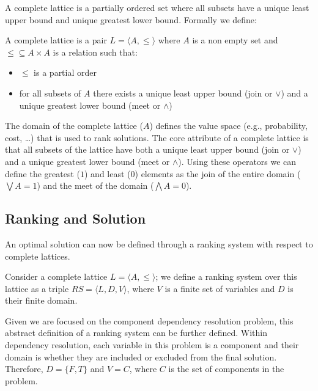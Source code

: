 A complete lattice is a partially ordered set where all subsets have a unique least upper bound and unique greatest lower bound.
Formally we define:
\begin{defs}
A complete lattice is a pair $L = \langle A, \leq \rangle$ where $A$ is a non empty set 
and $\leq \subseteq A \times A$ is a relation such that:
\begin{itemize}
  \item $\leq$ is a partial order
  \item for all subsets of $A$ there exists a unique least upper bound (join or $\vee$) and a unique greatest lower bound (meet or $\wedge$)
\end{itemize}
\end{defs}

The domain of the complete lattice ($A$) defines the value space (e.g., probability, cost, \ldots) 
that is used to rank solutions. 
The core attribute of a complete lattice is that all subsets of the lattice have both a unique least upper bound (join or $\vee$) 
and a unique greatest lower bound (meet or $\wedge$).
Using these operators we can define the greatest ($1$) and least ($0$) elements as
the join of the entire domain ($\bigvee A = 1$) and the meet of the domain ($\bigwedge A = 0$).

\subsection{Ranking and Solution}
An optimal solution can now be defined through a ranking system with respect to complete lattices.

\begin{defs}
Consider a complete lattice $L = \langle A, \leq \rangle$; we define 
a ranking system over this lattice as a triple $RS = \langle L, D, V \rangle$, 
where $V$ is a finite set of variables and $D$ is their finite domain.
\end{defs}

Given we are focused on the component dependency resolution problem,
this abstract definition of a ranking system can be further defined.
Within dependency resolution, 
each variable in this problem is a component and their domain is whether they are included or excluded from the final solution.
Therefore, $D = \{F,T\}$ and $V = C$, where $C$ is the set of components in the problem.

